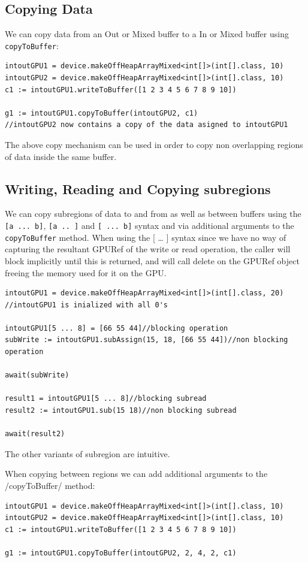 \documentclass[conc-doc]{subfiles}
\begin{document}
\subsection{Copying Data}
We can copy data from an Out or Mixed buffer to a In or Mixed buffer using \lstinline{copyToBuffer}:
\begin{lstlisting}
intoutGPU1 = device.makeOffHeapArrayMixed<int[]>(int[].class, 10)
intoutGPU2 = device.makeOffHeapArrayMixed<int[]>(int[].class, 10)
c1 := intoutGPU1.writeToBuffer([1 2 3 4 5 6 7 8 9 10])

g1 := intoutGPU1.copyToBuffer(intoutGPU2, c1)
//intoutGPU2 now contains a copy of the data asigned to intoutGPU1
\end{lstlisting}

The above copy mechanism can be used in order to copy non overlapping regions of data inside the same buffer.

\subsection{Writing, Reading and Copying subregions}
We can copy subregions of data to and from as well as between buffers using the \lstinline{[a ... b]}, \lstinline{[a .. ]} and \lstinline{[ ... b]} syntax and via additional arguments to the \lstinline{copyToBuffer} method. When using the [ … ] syntax since we have no way of capturing the resultant GPURef of the write or read operation, the caller will block implicitly until this is returned, and will call delete on the GPURef object freeing the memory used for it on the GPU.

\begin{lstlisting}
intoutGPU1 = device.makeOffHeapArrayMixed<int[]>(int[].class, 20)
//intoutGPU1 is inialized with all 0's

intoutGPU1[5 ... 8] = [66 55 44]//blocking operation
subWrite := intoutGPU1.subAssign(15, 18, [66 55 44])//non blocking operation

await(subWrite)

result1 = intoutGPU1[5 ... 8]//blocking subread
result2 := intoutGPU1.sub(15 18)//non blocking subread

await(result2)
\end{lstlisting}

The other variants of subregion are intuitive.

When copying between regions we can add additional arguments to the /copyToBuffer/ method:
\begin{lstlisting}
intoutGPU1 = device.makeOffHeapArrayMixed<int[]>(int[].class, 10)
intoutGPU2 = device.makeOffHeapArrayMixed<int[]>(int[].class, 10)
c1 := intoutGPU1.writeToBuffer([1 2 3 4 5 6 7 8 9 10])

g1 := intoutGPU1.copyToBuffer(intoutGPU2, 2, 4, 2, c1)
\end{lstlisting}
\end{document}
